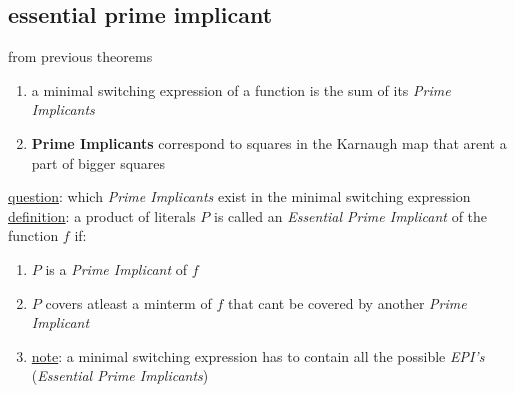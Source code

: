 \documentclass[a4paper,12pt]{article}
\begin{document}
\subsection{essential prime implicant}
\label{sec:org5d4f600}
from previous theorems\\
\begin{enumerate}
\item a minimal switching expression of a function is the sum of its \emph{Prime Implicants}\\
\item \textbf{Prime Implicants} correspond to squares in the Karnaugh map that arent a part of bigger squares\\
\end{enumerate}
\uline{question}: which \emph{Prime Implicants} exist in the minimal switching expression\\
\uline{definition}: a product of literals \(P\) is called an \emph{Essential Prime Implicant} of the function \(f\) if:\\
\begin{enumerate}
\item \(P\) is a \emph{Prime Implicant} of \(f\)\\
\item \(P\) covers atleast a minterm of \(f\) that cant be covered by another \emph{Prime Implicant}\\
\item \uline{note}: a minimal switching expression has to contain all the possible \emph{EPI's} (\emph{Essential Prime Implicants})\\
\end{enumerate}
\end{document}
